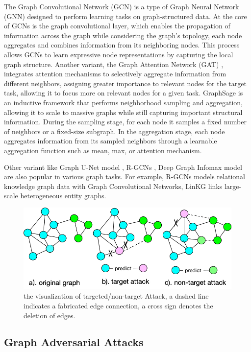 \documentclass[conference]{IEEEtran}
\begin{document}
The Graph Convolutional Network (GCN) \cite{kipf2017semi} is a type of Graph Neural Network (GNN) designed to perform learning tasks on graph-structured data. At the core of GCNs is the graph convolutional layer, which enables the propagation of information across the graph while considering the graph's topology, each node aggregates and combines information from its neighboring nodes. This process allows GCNs to learn expressive node representations by capturing the local graph structure.
Another variant, the Graph Attention Network (GAT) \cite{velickovic2018graph}, integrates attention mechanisms to selectively aggregate information from different neighbors, assigning greater importance to relevant nodes for the target task, allowing it to focus more on relevant nodes for a given task. 
GraphSage \cite{hamilton2017inductive} is an inductive framework that performs neighborhood sampling and aggregation, allowing it to scale to massive graphs while still capturing important structural information. During the sampling stage, for each node it samples a fixed number of neighbors or a fixed-size subgraph. In the aggregation stage, each node aggregates information from its sampled neighbors through a learnable aggregation function such as mean, max, or attention mechanism.

Other variant like Graph U-Net model \cite{gao2019graph}, R-GCNs \cite{Schlichtkrull2017ModelingRD}, Deep Graph Infomax model \cite{velickovic2018deep} are also popular in various graph tasks. For example, R-GCNs \cite{Schlichtkrull2017ModelingRD} models relational knowledge graph data with Graph Convolutional Networks, LinKG \cite{Zhang2019OAGTL} links large-scale heterogeneous entity graphs.

 \begin{figure}
  \centering
  \includegraphics[width=.5\textwidth]{attack.jpg} %
  \caption{the visualization of targeted/non-target Attack, a dashed line indicates a fabricated edge connection, a cross sign denotes the deletion of edges.} %
  \label{attack} %
\end{figure}

\subsection{Graph Adversarial Attacks}
\end{document}
